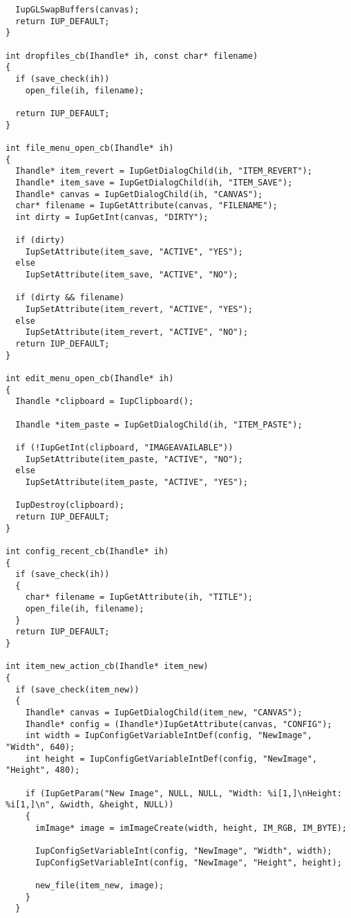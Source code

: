 \documentclass{ctexart}
\begin{document}
\begin{lstlisting}
  IupGLSwapBuffers(canvas);
  return IUP_DEFAULT;
}

int dropfiles_cb(Ihandle* ih, const char* filename)
{
  if (save_check(ih))
    open_file(ih, filename);

  return IUP_DEFAULT;
}

int file_menu_open_cb(Ihandle* ih)
{
  Ihandle* item_revert = IupGetDialogChild(ih, "ITEM_REVERT");
  Ihandle* item_save = IupGetDialogChild(ih, "ITEM_SAVE");
  Ihandle* canvas = IupGetDialogChild(ih, "CANVAS");
  char* filename = IupGetAttribute(canvas, "FILENAME");
  int dirty = IupGetInt(canvas, "DIRTY");

  if (dirty)
    IupSetAttribute(item_save, "ACTIVE", "YES");
  else
    IupSetAttribute(item_save, "ACTIVE", "NO");

  if (dirty && filename)
    IupSetAttribute(item_revert, "ACTIVE", "YES");
  else
    IupSetAttribute(item_revert, "ACTIVE", "NO");
  return IUP_DEFAULT;
}

int edit_menu_open_cb(Ihandle* ih)
{
  Ihandle *clipboard = IupClipboard(); 

  Ihandle *item_paste = IupGetDialogChild(ih, "ITEM_PASTE");

  if (!IupGetInt(clipboard, "IMAGEAVAILABLE"))
    IupSetAttribute(item_paste, "ACTIVE", "NO");
  else
    IupSetAttribute(item_paste, "ACTIVE", "YES");

  IupDestroy(clipboard);
  return IUP_DEFAULT;
}

int config_recent_cb(Ihandle* ih)
{
  if (save_check(ih))
  {
    char* filename = IupGetAttribute(ih, "TITLE");
    open_file(ih, filename);
  }
  return IUP_DEFAULT;
}

int item_new_action_cb(Ihandle* item_new)
{
  if (save_check(item_new))
  {
    Ihandle* canvas = IupGetDialogChild(item_new, "CANVAS");
    Ihandle* config = (Ihandle*)IupGetAttribute(canvas, "CONFIG");
    int width = IupConfigGetVariableIntDef(config, "NewImage", "Width", 640);
    int height = IupConfigGetVariableIntDef(config, "NewImage", "Height", 480);

    if (IupGetParam("New Image", NULL, NULL, "Width: %i[1,]\nHeight: %i[1,]\n", &width, &height, NULL))
    {
      imImage* image = imImageCreate(width, height, IM_RGB, IM_BYTE);

      IupConfigSetVariableInt(config, "NewImage", "Width", width);
      IupConfigSetVariableInt(config, "NewImage", "Height", height);

      new_file(item_new, image);
    }
  }


\end{lstlisting}
\end{document}
